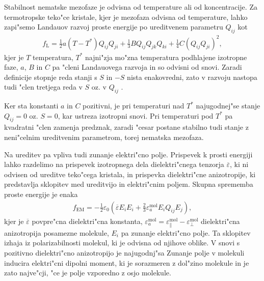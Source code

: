 \documentclass[12pt,twoside,openright,final]{report}
\begin{document}
Stabilnost nematske mezofaze je odvisna od temperature ali od koncentracije. 
Za termotropske teko"ce kristale, kjer je mezofaza odvisna od temperature, lahko zapi"semo Landauov razvoj proste energije po ureditvenem parametru $Q_{ij}$ kot
\begin{align}
  f_{\mathrm{L}} = \frac{1}{2}a(T-T^\ast)Q_{ij}Q_{ji} + \frac{1}{3}BQ_{ij}Q_{jk}Q_{ki} + \frac{1}{4}C(Q_{ij}Q_{ji})^2,
\end{align}
kjer je $T$ temperatura, $T^\ast$ najni"zja mo"zna temperatura podhlajene izotropne faze, $a$, $B$ in $C$ pa "cleni Landauovega razvoja in so odvisni od snovi. 
Zaradi definicije stopnje reda stanji s $S$ in $-S$ nista enakovredni, zato v razvoju nastopa tudi "clen tretjega reda v $S$ oz. v $Q_{ij}$ \cite{degennes,ravnik-zumer-ldg}. 

Ker sta konstanti $a$ in $C$ pozitivni, je pri temperaturi nad $T^\ast$ najugodnej"se stanje $Q_{ij}=0$ oz. $S=0$, kar ustreza izotropni snovi. 
Pri temperaturi pod $T^\ast$ pa kvadratni "clen zamenja predznak, zaradi "cesar postane stabilno tudi stanje z neni"celnim ureditvenim parametrom, torej nematska mezofaza. 

Na ureditev pa vpliva tudi zunanje elektri"cno polje. 
Prispevek k prosti energiji lahko razdelimo na prispevek izotropnega dela dielektri"cnega tenzorja $\overline\varepsilon$, ki ni odvisen od ureditve teko"cega kristala, in prispevka dielektri"cne anizotropije, ki predstavlja sklopitev med ureditvijo in elektri"cnim poljem. 
Skupna sprememba proste energije je enaka
\begin{align}
\label{eq:dielektricna-sklopitev}
  f_{\mathrm{EM}} = -\frac{1}{2}\varepsilon_0 \left(\overline\varepsilon E_i E_i + \frac{2}{3}\varepsilon_a^{\mathrm{mol}} E_iQ_{ij}E_j \right),
\end{align}
kjer je $\overline{\varepsilon}$ povpre"cna dielektri"cna konstanta, $\varepsilon_a^{\mathrm{mol}} = \varepsilon_{\parallel}^{\mathrm{mol}} - \varepsilon_{\perp}^{\mathrm{mol}}$ dielektri"cna anizotropija posamezne molekule, $E_i$ pa zunanje elektri"cno polje. 
Ta sklopitev izhaja iz polarizabilnosti molekul, ki je odvisna od njihove oblike. 
V snovi s pozitivno dielektri"cno anizotropijo je najugodnj"sa 
Zunanje polje v molekuli inducira elektri"cni dipolni moment, ki je sorazmeren z dol"zino molekule in je zato najve"cji, "ce je polje vzporedno z osjo molekule. 
\end{document}
